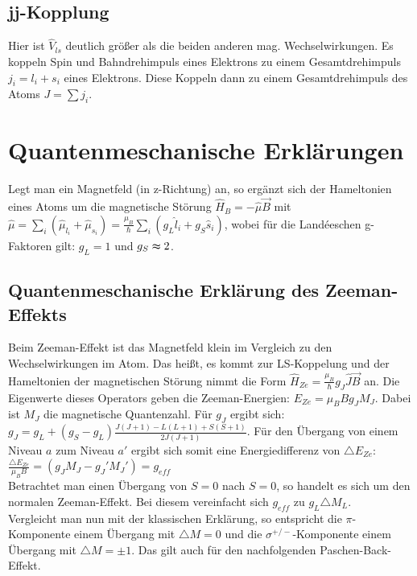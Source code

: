 \subsection{jj-Kopplung}

Hier ist $\hat{V}_{ls}$ deutlich größer als die beiden anderen mag.
Wechselwirkungen. Es koppeln Spin und Bahndrehimpuls eines Elektrons
zu einem Gesamtdrehimpuls $j_{i}=l_{i}+s_{i}$ eines Elektrons. Diese
Koppeln dann zu einem Gesamtdrehimpuls des Atoms $J=\sum j_{i}$.


\section{Quantenmeschanische Erklärungen}

Legt man ein Magnetfeld (in z-Richtung) an, so ergänzt sich der Hameltonien
eines Atoms um die magnetische Störung $\hat{H}_{B}=-\hat{\mu}\vec{B}$
mit $\hat{\mu}=\underset{i}{\sum}(\hat{\mu}_{l_{i}}+\hat{\mu}_{s_{i}})=\underset{}{\frac{\mu_{B}}{\hslash}\underset{i}{\sum}(g_{L}\hat{l}_{i}+g_{S}\hat{s}_{i})}$,
wobei für die Landéeschen g-Faktoren gilt: $g_{L}=1$ und $g_{S}\thickapprox2$. 


\subsection{Quantenmeschanische Erklärung des Zeeman-Effekts}

Beim Zeeman-Effekt ist das Magnetfeld klein im Vergleich zu den Wechselwirkungen
im Atom. Das heißt, es kommt zur LS-Koppelung und der Hameltonien
der magnetischen Störung nimmt die Form $\hat{H}_{Ze}=\frac{\mu_{B}}{\hslash}g_{J}\hat{J}\vec{B}$
an. Die Eigenwerte dieses Operators geben die Zeeman-Energien: $E_{Ze}=\mu_{B}Bg_{J}M_{J}$.
Dabei ist $M_{J}$ die magnetische Quantenzahl. Für $g_{J}$ ergibt
sich: $g_{J}=g_{L}+(g_{S}-g_{L})\frac{J(J+1)-L(L+1)+S(S+1)}{2J(J+1)}$.
Für den Übergang von einem Niveau $a$ zum Niveau $a'$ ergibt sich
somit eine Energiedifferenz von $\triangle E_{Ze}$: $\frac{\triangle E_{Ze}}{\mu_{B}B}=(g_{J}M_{J}-g_{J}'M_{J}')=g_{eff}$\\
Betrachtet man einen Übergang von $S=0$ nach $S=0$, so handelt es
sich um den normalen Zeeman-Effekt. Bei diesem vereinfacht sich $g_{eff}$
zu $g_{L}\triangle M_{L}$.\\
Vergleicht man nun mit der klassischen Erklärung, so entspricht die
$\pi$-Komponente einem Übergang mit $\triangle M=0$ und die $\sigma^{+/-}$-Komponente
einem Übergang mit $\triangle M=\pm1$. Das gilt auch für den nachfolgenden
Paschen-Back-Effekt.


